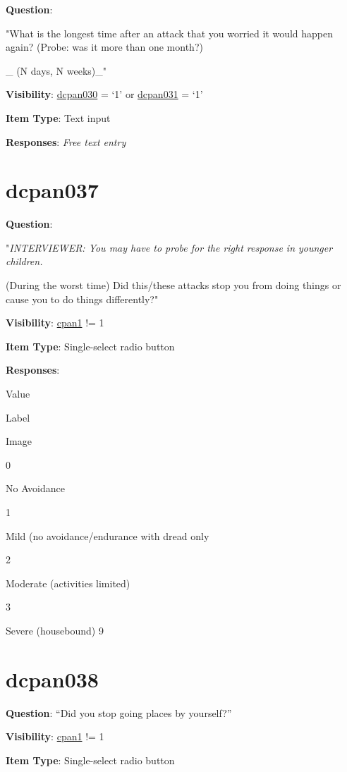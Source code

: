 \documentclass[]{book}
\begin{document}
\textbf{Question}:

"What is the longest time after an attack that you worried it would happen again? (Probe: was it more than one month?)

\_ (N days, N weeks)\_"

\textbf{Visibility}: \protect\hyperlink{dcpan030}{dcpan030} = `1' or \protect\hyperlink{dcpan031}{dcpan031} = `1'

\textbf{Item Type}: Text input

\textbf{Responses}: \emph{Free text entry}

\hypertarget{dcpan037}{%
\section{dcpan037}\label{dcpan037}}

\textbf{Question}:

"\emph{INTERVIEWER: You may have to probe for the right response in younger children.}

(During the worst time) Did this/these attacks stop you from doing things or cause you to do things differently?"

\textbf{Visibility}: \protect\hyperlink{cpan1}{cpan1} != 1

\textbf{Item Type}: Single-select radio button

\textbf{Responses}:

Value

Label

Image

0

No Avoidance

1

Mild (no avoidance/endurance with dread only

2

Moderate (activities limited)

3

Severe (housebound)\textbar{} 9

\hypertarget{dcpan038}{%
\section{dcpan038}\label{dcpan038}}

\textbf{Question}: ``Did you stop going places by yourself?''

\textbf{Visibility}: \protect\hyperlink{cpan1}{cpan1} != 1

\textbf{Item Type}: Single-select radio button
\end{document}
